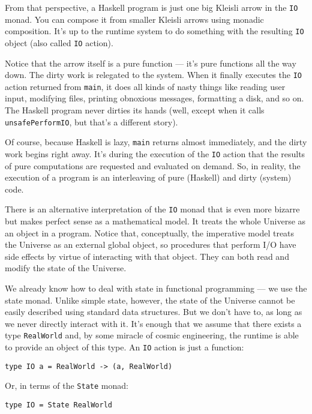 From that perspective, a Haskell program is just one big Kleisli arrow
in the \texttt{IO} monad. You can compose it from smaller Kleisli arrows
using monadic composition. It's up to the runtime system to do something
with the resulting \texttt{IO} object (also called \texttt{IO} action).

Notice that the arrow itself is a pure function --- it's pure functions
all the way down. The dirty work is relegated to the system. When it
finally executes the \texttt{IO} action returned from \texttt{main}, it
does all kinds of nasty things like reading user input, modifying files,
printing obnoxious messages, formatting a disk, and so on. The Haskell
program never dirties its hands (well, except when it calls
\texttt{unsafePerformIO}, but that's a different story).

Of course, because Haskell is lazy, \texttt{main} returns almost
immediately, and the dirty work begins right away. It's during the
execution of the \texttt{IO} action that the results of pure
computations are requested and evaluated on demand. So, in reality, the
execution of a program is an interleaving of pure (Haskell) and dirty
(system) code.

There is an alternative interpretation of the \texttt{IO} monad that is
even more bizarre but makes perfect sense as a mathematical model. It
treats the whole Universe as an object in a program. Notice that,
conceptually, the imperative model treats the Universe as an external
global object, so procedures that perform I/O have side effects by
virtue of interacting with that object. They can both read and modify
the state of the Universe.

We already know how to deal with state in functional programming --- we
use the state monad. Unlike simple state, however, the state of the
Universe cannot be easily described using standard data structures. But
we don't have to, as long as we never directly interact with it. It's
enough that we assume that there exists a type \texttt{RealWorld} and,
by some miracle of cosmic engineering, the runtime is able to provide an
object of this type. An \texttt{IO} action is just a function:

\begin{verbatim}
type IO a = RealWorld -> (a, RealWorld)
\end{verbatim}

Or, in terms of the \texttt{State} monad:

\begin{verbatim}
type IO = State RealWorld
\end{verbatim}

